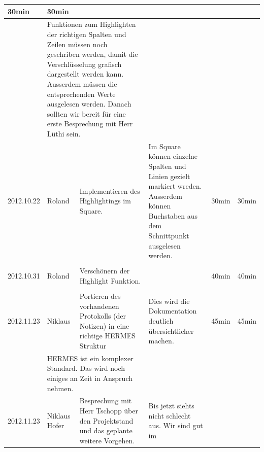 \documentclass[11pt,paper=a4,final]{scrartcl}
\begin{document}
\begin{landscape}
\begin{longtable}{|p{1.8cm}|p{1.5cm}|p{5.0cm}|p{11.0cm}|l|l|}
    30min & 30min \\ \hline \nopagebreak
    \multicolumn{2}{|l|}{\bf Pendenzen} &\multicolumn{2}{p{16.0cm}|}{Funktionen zum Highlighten der richtigen Spalten und Zeilen m\"ussen noch geschriben werden, damit die Verschl\"usselung grafisch dargestellt werden kann. Ausserdem m\"ussen die entsprechenden Werte ausgelesen werden. Danach sollten wir bereit f\"ur eine erste Besprechung mit Herr L\"uthi sein.}  & \multicolumn{2}{l|}{} \\ \hline
    \hline
    2012.10.22 & Roland &
    Implementieren des Highlightings im Square.&
    Im Square k\"onnen einzelne Spalten und Linien gezielt markiert wreden. Ausserdem k\"onnen Buchstaben aus dem Schnittpunkt ausgelesen werden.&
    30min & 30min \\ \hline \nopagebreak
    \multicolumn{2}{|l|}{\bf Pendenzen} &\multicolumn{2}{p{16.0cm}|}{}  & \multicolumn{2}{l|}{} \\ \hline
    \hline
    2012.10.31 & Roland &
    Versch\"onern der Highlight Funktion.&
    &
    40min & 40min \\ \hline \nopagebreak
    \multicolumn{2}{|l|}{\bf Pendenzen} &\multicolumn{2}{p{16.0cm}|}{}  & \multicolumn{2}{l|}{} \\ \hline
    \hline
    2012.11.23 & Niklaus &
    Portieren des vorhandenen Protokolls (der Notizen) in eine richtige HERMES
    Struktur&
    Dies wird die Dokumentation deutlich \"ubersichtlicher machen.&
    45min & 45min \\ \hline \nopagebreak
    \multicolumn{2}{|l|}{\bf Pendenzen} &\multicolumn{2}{p{16.0cm}|}{HERMES ist
    ein komplexer Standard. Das wird noch einiges an Zeit in Anspruch nehmen.}  & \multicolumn{2}{l|}{} \\ \hline
    \hline
    2012.11.23 & Niklaus Hofer &
    Besprechung mit Herr Tschopp \"uber den Projektstand und das geplante
    weitere Vorgehen. & Bis jetzt siehts nicht schlecht aus. Wir sind gut im

\end{longtable}
\end{landscape}
\end{document}
